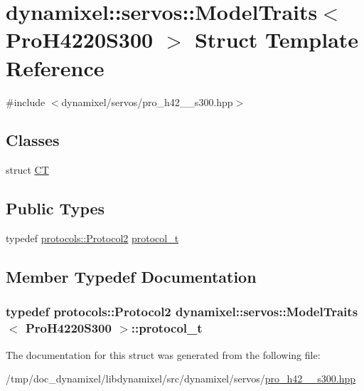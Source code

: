 \hypertarget{structdynamixel_1_1servos_1_1_model_traits_3_01_pro_h4220_s300_01_4}{}\section{dynamixel\+:\+:servos\+:\+:Model\+Traits$<$ Pro\+H4220\+S300 $>$ Struct Template Reference}
\label{structdynamixel_1_1servos_1_1_model_traits_3_01_pro_h4220_s300_01_4}


{\ttfamily \#include $<$dynamixel/servos/pro\+\_\+h42\+\_\+\_\+s300.\+hpp$>$}

\subsection*{Classes}
\begin{DoxyCompactItemize}
\item 
struct \hyperlink{structdynamixel_1_1servos_1_1_model_traits_3_01_pro_h4220_s300_01_4_1_1_c_t}{C\+T}
\end{DoxyCompactItemize}
\subsection*{Public Types}
\begin{DoxyCompactItemize}
\item 
typedef \hyperlink{classdynamixel_1_1protocols_1_1_protocol2}{protocols\+::\+Protocol2} \hyperlink{structdynamixel_1_1servos_1_1_model_traits_3_01_pro_h4220_s300_01_4_af0a83d7ff1740d0a0c61f653d1c48f45}{protocol\+\_\+t}
\end{DoxyCompactItemize}


\subsection{Member Typedef Documentation}
\hypertarget{structdynamixel_1_1servos_1_1_model_traits_3_01_pro_h4220_s300_01_4_af0a83d7ff1740d0a0c61f653d1c48f45}{}
\subsubsection[{protocol\+\_\+t}]{\setlength{\rightskip}{0pt plus 5cm}typedef {\bf protocols\+::\+Protocol2} {\bf dynamixel\+::servos\+::\+Model\+Traits}$<$ {\bf Pro\+H4220\+S300} $>$\+::{\bf protocol\+\_\+t}}\label{structdynamixel_1_1servos_1_1_model_traits_3_01_pro_h4220_s300_01_4_af0a83d7ff1740d0a0c61f653d1c48f45}


The documentation for this struct was generated from the following file\+:\begin{DoxyCompactItemize}
\item 
/tmp/doc\+\_\+dynamixel/libdynamixel/src/dynamixel/servos/\hyperlink{pro__h42__20__s300_8hpp}{pro\+\_\+h42\+\_\+\_\+s300.\+hpp}\end{DoxyCompactItemize}
